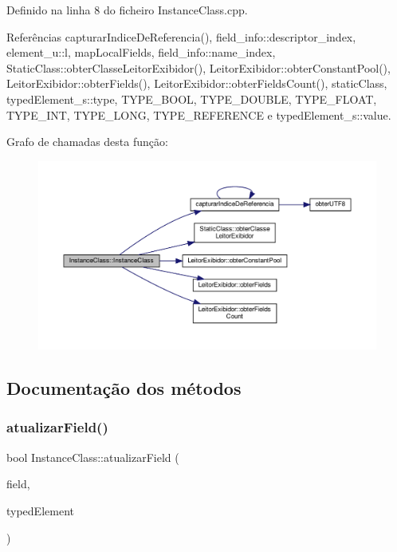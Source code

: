 Definido na linha 8 do ficheiro Instance\+Class.\+cpp.



Referências capturar\+Indice\+De\+Referencia(), field\+\_\+info\+::descriptor\+\_\+index, element\+\_\+u\+::l, map\+Local\+Fields, field\+\_\+info\+::name\+\_\+index, Static\+Class\+::obter\+Classe\+Leitor\+Exibidor(), Leitor\+Exibidor\+::obter\+Constant\+Pool(), Leitor\+Exibidor\+::obter\+Fields(), Leitor\+Exibidor\+::obter\+Fields\+Count(), static\+Class, typed\+Element\+\_\+s\+::type, T\+Y\+P\+E\+\_\+\+B\+O\+OL, T\+Y\+P\+E\+\_\+\+D\+O\+U\+B\+LE, T\+Y\+P\+E\+\_\+\+F\+L\+O\+AT, T\+Y\+P\+E\+\_\+\+I\+NT, T\+Y\+P\+E\+\_\+\+L\+O\+NG, T\+Y\+P\+E\+\_\+\+R\+E\+F\+E\+R\+E\+N\+CE e typed\+Element\+\_\+s\+::value.

Grafo de chamadas desta função\+:
\nopagebreak
\begin{figure}[H]
\begin{center}
\leavevmode
\includegraphics[width=350pt]{classInstanceClass_ac1bee1eb9725e1fec8de7f4cf97f369c_cgraph}
\end{center}
\end{figure}


\subsection{Documentação dos métodos}
\mbox{\label{classInstanceClass_a3af2fc7bfe8f406b5ea6efbf18161514}} 
\subsubsection{\texorpdfstring{atualizar\+Field()}{atualizarField()}}
{\footnotesize\ttfamily bool Instance\+Class\+::atualizar\+Field (\begin{DoxyParamCaption}\item[{string}]{field,  }\item[{\hyperlink{BasicTypes_8h_a97b332303b1262282599e6ede0637b82}{Typed\+Element}}]{typed\+Element }\end{DoxyParamCaption})}



